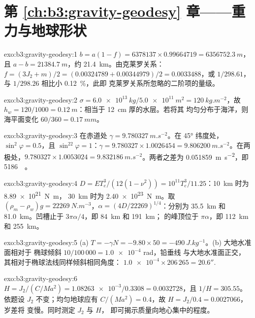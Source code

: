 \section*{第 \ref{ch:b3:gravity-geodesy} 章——重力与地球形状}

\begin{solution}{exo:b3:gravity-geodesy:1}
$b = a(1 - f) = 6378137\times0.99664719 = \qty{6356752.3}{m}$，且
$a - b = \qty{21384.7}{m}$，约 \qty{21.4}{km}。由克莱罗关系：
$f = (3J_2 + m)/2 = (0.00324789 + 0.00344979)/2 = \num{0.0033488}$，或
$1/298.61$，与 $1/298.26$ 相比小 \qty{0.12}{\percent}，此即
克莱罗关系所忽略的二阶项的量级。
\end{solution}

\begin{solution}{exo:b3:gravity-geodesy:2}
$\sigma = \qty{6.0e13}{kg}/\qty{5.0e11}{m^2} = \qty{120}{kg.m^{-2}}$，故
$h_w = 120/1000 = \qty{0.12}{m}$：相当于 \qty{12}{cm} 厚的水层。若将其
均匀分布于海洋，则海平面变化 $60/360 = \qty{0.17}{mm}$。
\end{solution}

\begin{solution}{exo:b3:gravity-geodesy:3}
在赤道处 $\gamma = \qty{9.780327}{m.s^{-2}}$。在 \ang{45} 纬度处，
$\sin^2\varphi = 0.5$，且 $\sin^22\varphi = 1$：$\gamma = 9.780327\times1.0026454
= \qty{9.806200}{m.s^{-2}}$。在两极处，$9.780327\times1.0053024 =
\qty{9.832186}{m.s^{-2}}$。两者之差为 \qty{0.051859}{m.s^{-2}}，即
\qty{5186}{\milli\gal}。
\end{solution}

\begin{solution}{exo:b3:gravity-geodesy:4}
$D = ET_e^3/(12(1 - \nu^2)) = 10^{11}T_e^3/11.25$：\qty{10}{km} 时为 \qty{8.89e21}{N.m}，
\qty{30}{km} 时为 \qty{2.40e23}{N.m}。取 $(\rho_m - \rho_w)g =
\qty{22269}{N.m^{-3}}$，$\alpha = (4D/22269)^{1/4}$：分别为 \qty{35.5}{km} 和
\qty{81.0}{km}。凹槽止于 $3\pi\alpha/4$，即 \qty{84}{km} 和 \qty{191}{km}；
的峰顶位于 $\pi\alpha$，即 \qty{112}{km} 和 \qty{255}{km}。
\end{solution}

\begin{solution}{exo:b3:gravity-geodesy:5}
(a) $T = -\gamma N = -9.80\times50 = \qty{-490}{J.kg^{-1}}$。(b) 大地水准面相对于
椭球倾斜 $10/100\,000 = \num{1.0e-4}$ rad，铅垂线
与大地水准面正交，其相对于椭球法线同样倾斜相同角度：
$\num{1.0e-4}\times206\,265 = 20.6''$.
\end{solution}

\begin{solution}{exo:b3:gravity-geodesy:6}
$H = J_2/(C/Ma^2) = \num{1.08263e-3}/0.3308 = \num{0.0032728}$，且
$1/H = 305.55$。依题设 $J_2$ 不变；均匀地球应有
$C/(Ma^2) = 0.4$，故 $H = J_2/0.4 = \num{0.0027066}$，岁差将
变慢。同时测定 $J_2$ 与 $H$，
即可揭示质量向地心集中的程度。
\end{solution}

